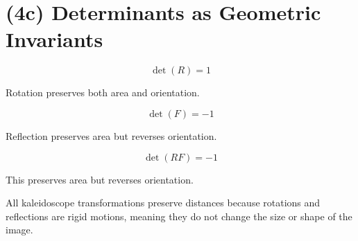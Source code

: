 \documentclass{ximera}
\begin{document}
\section*{(4c) Determinants as Geometric Invariants}

\[
\det(R) = 1
\]

Rotation preserves both area and orientation.

\[
\det(F) = -1
\]

Reflection preserves area but reverses orientation.

\[
\det(RF) = -1
\]

This preserves area but reverses orientation.

\vspace{0.3cm}

All kaleidoscope transformations preserve distances because rotations and reflections are rigid motions, meaning they do not change the size or shape of the image.
\end{document}
